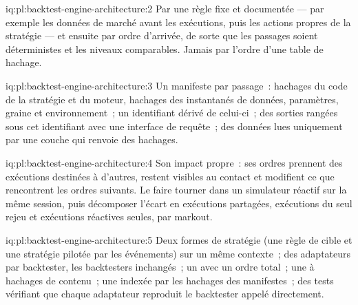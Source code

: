 \begin{solution}{iq:pl:backtest-engine-architecture:2}
Par une règle fixe et documentée --- par exemple les données de marché avant les exécutions, puis les actions propres de la stratégie --- et ensuite par ordre d'arrivée, de sorte que
les passages soient déterministes et les niveaux comparables. Jamais par l'ordre d'une table de hachage.
\end{solution}

\begin{solution}{iq:pl:backtest-engine-architecture:3}
Un manifeste par passage~: hachages du code de la stratégie et du moteur, hachages des instantanés de données, paramètres, graine et environnement~; un identifiant dérivé
de celui-ci~; des sorties rangées sous cet identifiant avec une interface de requête~; des données lues uniquement par une couche qui renvoie des hachages.
\end{solution}

\begin{solution}{iq:pl:backtest-engine-architecture:4}
Son impact propre~: ses ordres prennent des exécutions destinées à d'autres, restent visibles au contact et modifient ce que rencontrent les ordres suivants. Le faire tourner dans un
simulateur réactif sur la même session, puis décomposer l'écart en exécutions partagées, exécutions du seul rejeu et exécutions réactives seules, par
markout.
\end{solution}

\begin{solution}{iq:pl:backtest-engine-architecture:5}
Deux formes de stratégie (une règle de cible et une stratégie pilotée par les événements) sur un même contexte~; des adaptateurs par backtester, les backtesters inchangés~; un
 avec un ordre total~; une  à hachages de contenu~; une  indexée par les hachages des manifestes~; des tests vérifiant que chaque adaptateur
reproduit le backtester appelé directement.
\end{solution}

